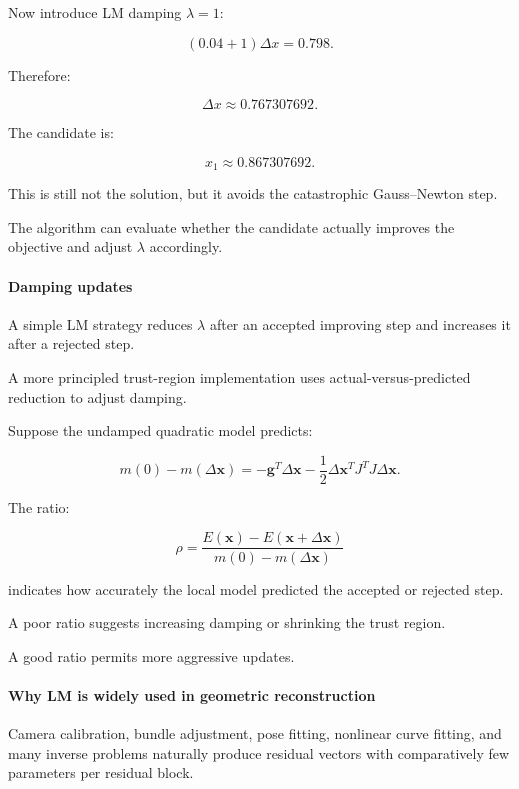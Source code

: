 Now introduce LM damping \(\lambda=1\):

\[
(0.04+1)\Delta x=0.798.
\]

Therefore:

\[
\boxed{ \Delta x\approx0.767307692 }.
\]

The candidate is:

\[
x_1\approx0.867307692.
\]

This is still not the solution, but it avoids the catastrophic Gauss--Newton step.

The algorithm can evaluate whether the candidate actually improves the objective and adjust \(\lambda\) accordingly.

\paragraph{Damping updates}\label{02-foundations-ii-ch027-damping-updates}

\hypertarget{02-foundations-ii-ch027-damping-updates}{}

A simple LM strategy reduces \(\lambda\) after an accepted improving step and increases it after a rejected step.

A more principled trust-region implementation uses actual-versus-predicted reduction to adjust damping.

Suppose the undamped quadratic model predicts:

\[
m(0)-m(\Delta\mathbf x) = -\mathbf g^T\Delta\mathbf x -\frac12\Delta\mathbf x^TJ^TJ\Delta\mathbf x.
\]

The ratio:

\[
\rho= \frac{ E(\mathbf x)-E(\mathbf x+\Delta\mathbf x) }{ m(0)-m(\Delta\mathbf x) }
\]

indicates how accurately the local model predicted the accepted or rejected step.

A poor ratio suggests increasing damping or shrinking the trust region.

A good ratio permits more aggressive updates.

\paragraph{Why LM is widely used in geometric reconstruction}\label{02-foundations-ii-ch027-why-lm-is-widely-used-in-geometric-reconstruction}

\hypertarget{02-foundations-ii-ch027-why-lm-is-widely-used-in-geometric-reconstruction}{}

Camera calibration, bundle adjustment, pose fitting, nonlinear curve fitting, and many inverse problems naturally produce residual vectors with comparatively few parameters per residual block.

